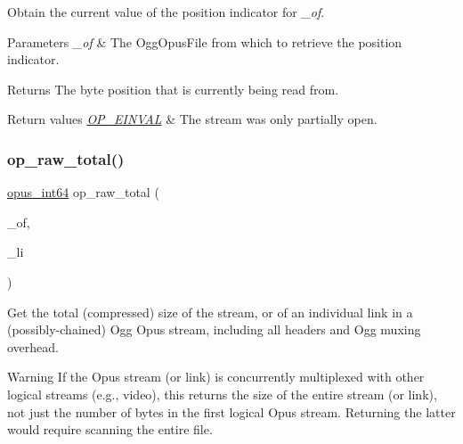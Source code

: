 Obtain the current value of the position indicator for {\itshape \+\_\+of}. 
\begin{DoxyParams}{Parameters}
{\em \+\_\+of} & The {\ttfamily Ogg\+Opus\+File} from which to retrieve the position indicator. \\
\hline
\end{DoxyParams}
\begin{DoxyReturn}{Returns}
The byte position that is currently being read from. 
\end{DoxyReturn}

\begin{DoxyRetVals}{Return values}
{\em \hyperlink{group__error__codes_gae0879acafe9cc0ab72462d291fdb6fb6}{O\+P\+\_\+\+E\+I\+N\+V\+AL}} & The stream was only partially open. \\
\hline
\end{DoxyRetVals}
\mbox{\label{group__stream__info_gaa433bdeab96315d315269b60ba52b877}} 
\subsubsection{\texorpdfstring{op\+\_\+raw\+\_\+total()}{op\_raw\_total()}}
{\footnotesize\ttfamily \hyperlink{opus__types_8h_ab6742070cf9d0ccffca2b80522b4f41a}{opus\+\_\+int64} op\+\_\+raw\+\_\+total (\begin{DoxyParamCaption}\item[{\hyperlink{zconf_8h_a2c212835823e3c54a8ab6d95c652660e}{const} Ogg\+Opus\+File $\ast$}]{\+\_\+of,  }\item[{int}]{\+\_\+li }\end{DoxyParamCaption})}

Get the total (compressed) size of the stream, or of an individual link in a (possibly-\/chained) Ogg Opus stream, including all headers and Ogg muxing overhead. \begin{DoxyWarning}{Warning}
If the Opus stream (or link) is concurrently multiplexed with other logical streams (e.\+g., video), this returns the size of the entire stream (or link), not just the number of bytes in the first logical Opus stream. Returning the latter would require scanning the entire file. 
\end{DoxyWarning}

